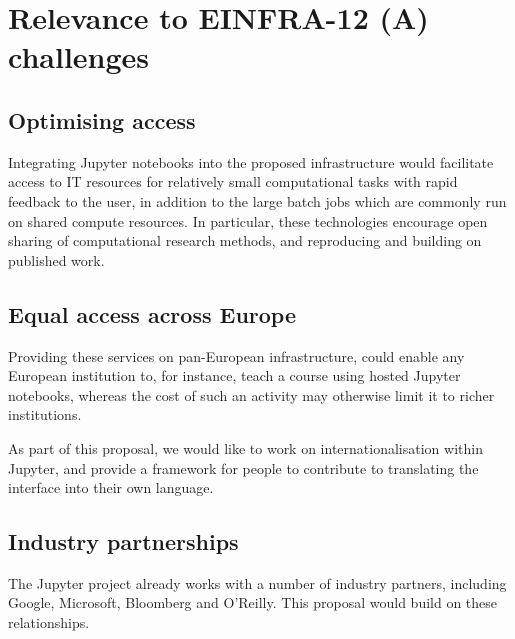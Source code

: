 

\section{Relevance to EINFRA-12 (A) challenges}


\subsection{Optimising access}

Integrating Jupyter notebooks into the proposed infrastructure would facilitate
access to IT resources for relatively small computational tasks with rapid
feedback to the user, in addition to the large batch jobs which are commonly
run on shared compute resources. In particular, these technologies encourage
open sharing of computational research methods, and reproducing and building on
published work.


\subsection{Equal access across Europe}

Providing these services on pan-European infrastructure, could enable any
European institution to, for instance, teach a course using hosted Jupyter
notebooks, whereas the cost of such an activity may otherwise limit it to richer
institutions.

As part of this proposal, we would like to work on internationalisation within
Jupyter, and provide a framework for people to contribute to translating the
interface into their own language.


\subsection{Industry partnerships}

The Jupyter project already works with a number of industry partners, including
Google, Microsoft, Bloomberg and O'Reilly. This proposal would build on these
relationships.

